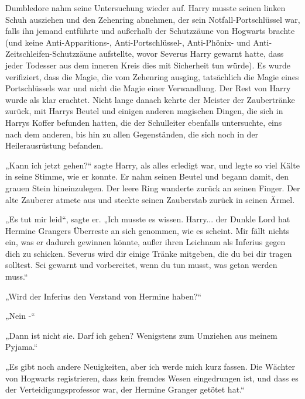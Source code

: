 {Dumbledore nahm seine Untersuchung wieder auf. Harry musste seinen linken Schuh ausziehen und den Zehenring abnehmen, der sein Notfall-Portschlüssel war, falls ihn jemand entführte und außerhalb der Schutzzäune von Hogwarts brachte (und keine Anti-Apparitions-, Anti-Portschlüssel-, Anti-Phönix- und Anti-Zeitschleifen-Schutzzäune aufstellte, wovor Severus Harry gewarnt hatte, dass jeder Todesser aus dem inneren Kreis dies mit Sicherheit tun würde). Es wurde verifiziert, dass die Magie, die vom Zehenring ausging, tatsächlich die Magie eines Portschlüssels war und nicht die Magie einer Verwandlung. Der Rest von Harry wurde als klar erachtet. Nicht lange danach kehrte der Meister der Zaubertränke zurück, mit Harrys Beutel und einigen anderen magischen Dingen, die sich in Harrys Koffer befunden hatten, die der Schulleiter ebenfalls untersuchte, eins nach dem anderen, bis hin zu allen Gegenständen, die sich noch in der Heilerausrüstung befanden.

„Kann ich jetzt gehen?“ sagte Harry, als alles erledigt war, und legte so viel Kälte in seine Stimme, wie er konnte. Er nahm seinen Beutel und begann damit, den grauen Stein hineinzulegen. Der leere Ring wanderte zurück an seinen Finger. Der alte Zauberer atmete aus und steckte seinen Zauberstab zurück in seinen Ärmel.

„Es tut mir leid“, sagte er. „Ich musste es wissen. Harry... der Dunkle Lord hat Hermine Grangers Überreste an sich genommen, wie es scheint. Mir fällt nichts ein, was er dadurch gewinnen könnte, außer ihren Leichnam als Inferius gegen dich zu schicken. Severus wird dir einige Tränke mitgeben, die du bei dir tragen solltest. Sei gewarnt und vorbereitet, wenn du tun musst, was getan werden muss.“

„Wird der Inferius den Verstand von Hermine haben?“

„Nein -“

„Dann ist nicht sie. Darf ich gehen? Wenigstens zum Umziehen aus meinem Pyjama.“

„Es gibt noch andere Neuigkeiten, aber ich werde mich kurz fassen. Die Wächter von Hogwarts registrieren, dass kein fremdes Wesen eingedrungen ist, und dass es der Verteidigungsprofessor war, der Hermine Granger getötet hat.“

}
